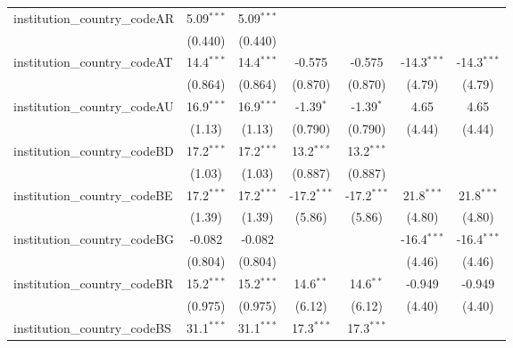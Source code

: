 \begin{tabular}{lcccccc}
   institution\_country\_codeAR          & 5.09$^{***}$  & 5.09$^{***}$  &               &               &               &   \\   
                                         & (0.440)       & (0.440)       &               &               &               &   \\   
   institution\_country\_codeAT          & 14.4$^{***}$  & 14.4$^{***}$  & -0.575        & -0.575        & -14.3$^{***}$ & -14.3$^{***}$\\   
                                         & (0.864)       & (0.864)       & (0.870)       & (0.870)       & (4.79)        & (4.79)\\   
   institution\_country\_codeAU          & 16.9$^{***}$  & 16.9$^{***}$  & -1.39$^{*}$   & -1.39$^{*}$   & 4.65          & 4.65\\   
                                         & (1.13)        & (1.13)        & (0.790)       & (0.790)       & (4.44)        & (4.44)\\   
   institution\_country\_codeBD          & 17.2$^{***}$  & 17.2$^{***}$  & 13.2$^{***}$  & 13.2$^{***}$  &               &   \\   
                                         & (1.03)        & (1.03)        & (0.887)       & (0.887)       &               &   \\   
   institution\_country\_codeBE          & 17.2$^{***}$  & 17.2$^{***}$  & -17.2$^{***}$ & -17.2$^{***}$ & 21.8$^{***}$  & 21.8$^{***}$\\   
                                         & (1.39)        & (1.39)        & (5.86)        & (5.86)        & (4.80)        & (4.80)\\   
   institution\_country\_codeBG          & -0.082        & -0.082        &               &               & -16.4$^{***}$ & -16.4$^{***}$\\   
                                         & (0.804)       & (0.804)       &               &               & (4.46)        & (4.46)\\   
   institution\_country\_codeBR          & 15.2$^{***}$  & 15.2$^{***}$  & 14.6$^{**}$   & 14.6$^{**}$   & -0.949        & -0.949\\   
                                         & (0.975)       & (0.975)       & (6.12)        & (6.12)        & (4.40)        & (4.40)\\   
   institution\_country\_codeBS          & 31.1$^{***}$  & 31.1$^{***}$  & 17.3$^{***}$  & 17.3$^{***}$  &               &   \\   

\end{tabular}
